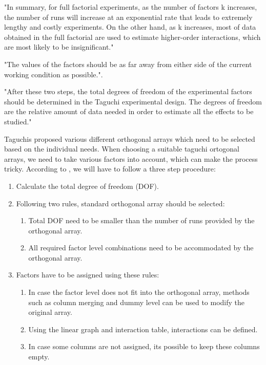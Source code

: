 "In summary, for full factorial experiments, as the number of factors k increases, the number of runs will increase at an exponential rate that leads to extremely lengthy and costly experiments. On the other hand, as k increases, most of data obtained in the full factorial are used to estimate higher-order interactions, which are most likely to be insignificant."\cite{yang_design_2009}

"The values of the factors should be as far away from either side of the current working condition as possible."\cite{roy_primer_1990}.

"After these two steps, the total degrees of freedom of the experimental factors should be determined in the Taguchi experimental design. The degrees of freedom are the relative amount of data needed in order to estimate all the effects to be studied."\cite{yang_design_2009}


Taguchis proposed various different orthogonal arrays which need to be selected based on the individual needs.
When choosing a suitable taguchi ortogonal arrays, we need to take various factors into account, which can make the process tricky. According to \cite{yang_design_2009}, we will have to follow a three step procedure:

\begin{enumerate}
	\item Calculate the total degree of freedom (DOF). 
	\item Following two rules, standard orthogonal array should be selected:
	\begin{enumerate}
		\item Total DOF need to be smaller than the number of runs provided by the orthogonal array.
		\item All required factor level combinations need to be accommodated by the orthogonal array.
	\end{enumerate}
	
	\item Factors have to be assigned using these rules: 
	\begin{enumerate}
		\item In case the factor level does not fit into the orthogonal array, methods such as column merging and dummy level can be used to modify the original array.
		\item Using the linear graph and interaction table, interactions can be defined. 
		\item In case some columns are not assigned, its possible to keep these columns empty.
	\end{enumerate}
\end{enumerate}


